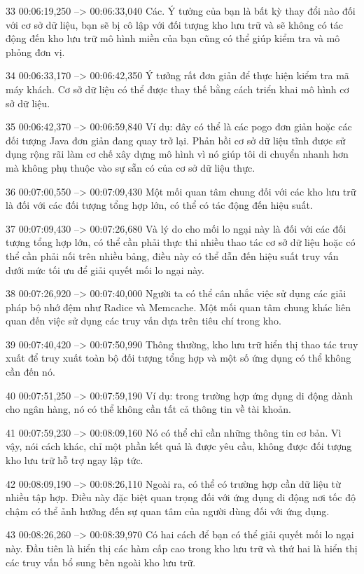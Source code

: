 33
00:06:19,250 --> 00:06:33,040
Các.  Ý tưởng của bạn là bất kỳ thay đổi nào đối với cơ sở dữ liệu, bạn sẽ bị cô lập với đối tượng kho lưu trữ và sẽ không có tác động đến kho lưu trữ mô hình miền của bạn cũng có thể giúp kiểm tra và mô phỏng đơn vị.

34
00:06:33,170 --> 00:06:42,350
Ý tưởng rất đơn giản để thực hiện kiểm tra mã máy khách.  Cơ sở dữ liệu có thể được thay thế bằng cách triển khai mô hình cơ sở dữ liệu.

35
00:06:42,370 --> 00:06:59,840
Ví dụ: đây có thể là các pogo đơn giản hoặc các đối tượng Java đơn giản đang quay trở lại.  Phản hồi cơ sở dữ liệu tĩnh được sử dụng rộng rãi làm cơ chế xây dựng mô hình vì nó giúp tôi di chuyển nhanh hơn mà không phụ thuộc vào sự sẵn có của cơ sở dữ liệu thực.

36
00:07:00,550 --> 00:07:09,430
Một mối quan tâm chung đối với các kho lưu trữ là đối với các đối tượng tổng hợp lớn, có thể có tác động đến hiệu suất.

37
00:07:09,430 --> 00:07:26,680
Và lý do cho mối lo ngại này là đối với các đối tượng tổng hợp lớn, có thể cần phải thực thi nhiều thao tác cơ sở dữ liệu hoặc có thể cần phải nối trên nhiều bảng, điều này có thể dẫn đến hiệu suất truy vấn dưới mức tối ưu để giải quyết mối lo ngại này.

38
00:07:26,920 --> 00:07:40,000
Người ta có thể cân nhắc việc sử dụng các giải pháp bộ nhớ đệm như Radice và Memcache.  Một mối quan tâm chung khác liên quan đến việc sử dụng các truy vấn dựa trên tiêu chí trong kho.

39
00:07:40,420 --> 00:07:50,990
Thông thường, kho lưu trữ hiển thị thao tác truy xuất để truy xuất toàn bộ đối tượng tổng hợp và một số ứng dụng có thể không cần đến nó.

40
00:07:51,250 --> 00:07:59,190
Ví dụ: trong trường hợp ứng dụng di động dành cho ngân hàng, nó có thể không cần tất cả thông tin về tài khoản.

41
00:07:59,230 --> 00:08:09,160
Nó có thể chỉ cần những thông tin cơ bản.  Vì vậy, nói cách khác, chỉ một phần kết quả là được yêu cầu, không được đối tượng kho lưu trữ hỗ trợ ngay lập tức.

42
00:08:09,190 --> 00:08:26,110
Ngoài ra, có thể có trường hợp cần dữ liệu từ nhiều tập hợp.  Điều này đặc biệt quan trọng đối với ứng dụng di động nơi tốc độ chậm có thể ảnh hưởng đến sự quan tâm của người dùng đối với ứng dụng.

43
00:08:26,260 --> 00:08:39,970
Có hai cách để bạn có thể giải quyết mối lo ngại này.  Đầu tiên là hiển thị các hàm cấp cao trong kho lưu trữ và thứ hai là hiển thị các truy vấn bổ sung bên ngoài kho lưu trữ.

